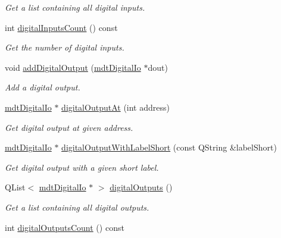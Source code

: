 \begin{DoxyCompactItemize}
\begin{DoxyCompactList}\small\item\em Get a list containing all digital inputs. \end{DoxyCompactList}\item 
\hypertarget{classmdt_device_ios_a8d6306c16a25c82d6d8002020f4dc16a}{
int \hyperlink{classmdt_device_ios_a8d6306c16a25c82d6d8002020f4dc16a}{digitalInputsCount} () const }
\label{classmdt_device_ios_a8d6306c16a25c82d6d8002020f4dc16a}

\begin{DoxyCompactList}\small\item\em Get the number of digital inputs. \end{DoxyCompactList}\item 
void \hyperlink{classmdt_device_ios_af1f41d3c60f1030fb303436820417d14}{addDigitalOutput} (\hyperlink{classmdt_digital_io}{mdtDigitalIo} $\ast$dout)
\begin{DoxyCompactList}\small\item\em Add a digital output. \end{DoxyCompactList}\item 
\hyperlink{classmdt_digital_io}{mdtDigitalIo} $\ast$ \hyperlink{classmdt_device_ios_ac2fed299f5ba1884c01adde195c5b007}{digitalOutputAt} (int address)
\begin{DoxyCompactList}\small\item\em Get digital output at given address. \end{DoxyCompactList}\item 
\hyperlink{classmdt_digital_io}{mdtDigitalIo} $\ast$ \hyperlink{classmdt_device_ios_acecc7f9abb21613fed90212eef4d4dda}{digitalOutputWithLabelShort} (const QString \&labelShort)
\begin{DoxyCompactList}\small\item\em Get digital output with a given short label. \end{DoxyCompactList}\item 
\hypertarget{classmdt_device_ios_a8a72f1844f794d4b5cb7bfede8bcef99}{
QList$<$ \hyperlink{classmdt_digital_io}{mdtDigitalIo} $\ast$ $>$ \hyperlink{classmdt_device_ios_a8a72f1844f794d4b5cb7bfede8bcef99}{digitalOutputs} ()}
\label{classmdt_device_ios_a8a72f1844f794d4b5cb7bfede8bcef99}

\begin{DoxyCompactList}\small\item\em Get a list containing all digital outputs. \end{DoxyCompactList}\item 
\hypertarget{classmdt_device_ios_a81041e03a387fdcdc2638527b27a0ff6}{
int \hyperlink{classmdt_device_ios_a81041e03a387fdcdc2638527b27a0ff6}{digitalOutputsCount} () const }
\label{classmdt_device_ios_a81041e03a387fdcdc2638527b27a0ff6}


\end{DoxyCompactItemize}
